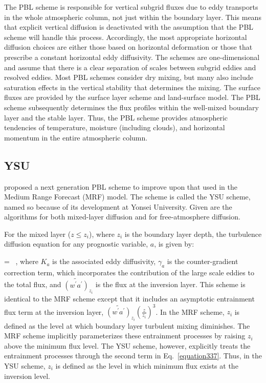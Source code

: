 The PBL scheme is responsible for vertical subgrid fluxes due to eddy transports in the whole atmospheric column, not just within the boundary layer. This means that explicit vertical diffusion is deactivated with the assumption that the PBL scheme will handle this process. Accordingly, the most appropriate horizontal diffusion choices are either those based on horizontal deformation or those that prescribe a constant horizontal eddy diffusivity. The schemes are one-dimensional and assume that there is a clear separation of scales between subgrid eddies and resolved eddies. Most PBL schemes consider dry mixing, but many also include saturation effects in the vertical stability that determines the mixing. The surface fluxes are provided by the surface layer scheme and land-surface model. The PBL scheme subsequently determines the flux profiles within the well-mixed boundary layer and the stable layer. Thus, the PBL scheme provides atmospheric tendencies of temperature, moisture (including clouds), and horizontal momentum in the entire atmospheric column.

\subsection{YSU}
\label{pbl-ysu-361}

 \citet{Hong06} proposed a next generation PBL scheme to improve upon that used in the Medium Range Forecast (MRF) model. The scheme is called the YSU scheme, named so because of its development at Yonsei University. Given are the algorithms for both mixed-layer diffusion and for free-atmosphere diffusion.

For the mixed layer ($z \leq z_i$), where $z_i$ is the boundary layer depth, the turbulence diffusion equation for any prognostic variable, $a$, is given by:

\bea
{} =  \, , \label{equation337}
\eea
\noindent
 where $K_a$ is the associated eddy diffusivity, $\gamma_a$ is the counter-gradient correction term, which incorporates the contribution of the large scale eddies to the total flux, and $\widetilde{(w^{\prime}a^{\prime})}_{z_i}$ is the flux at the inversion layer. This scheme is identical to the MRF scheme except that it includes an asymptotic entrainment flux term at the inversion layer, $\widetilde{(w^{\prime}a^{\prime})}_{z_i}\left(\frac{z}{z_i} \right)^3$. In the MRF scheme, $z_i$ is defined as the level at which boundary layer turbulent mixing diminishes. The MRF scheme implicitly parameterizes these entrainment processes by raising $z_i$ above the minimum flux level. The YSU scheme, however, explicitly treats the entrainment processes through the second term in Eq.~\eqref{equation337}. Thus, in the YSU scheme, $z_i$ is defined as the level in which minimum flux exists at the inversion level.

